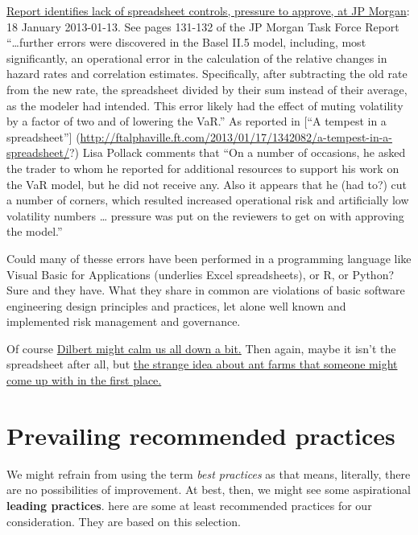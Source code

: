 \documentclass[
]{book}
\begin{document}
\begin{itemize}
  \href{http://files.shareholder.com/downloads/ONE/2261602328x0x628656/4cb574a0-0bf5-4728-9582-625e4519b5ab/Task_Force_Report.pdf}{Report identifies lack of spreadsheet controls, pressure to approve, at JP Morgan}: 18 January 2013-01-13. See pages 131-132 of the JP Morgan Task Force Report ``\ldots further errors were discovered in the Basel II.5 model, including, most significantly, an operational error in the calculation of the relative changes in hazard rates and correlation estimates. Specifically, after subtracting the old rate from the new rate, the spreadsheet divided by their sum instead of their average, as the modeler had intended. This error likely had the effect of muting volatility by a factor of two and of lowering the VaR.'' As reported in {[}``A tempest in a spreadsheet''{]} (\url{http://ftalphaville.ft.com/2013/01/17/1342082/a-tempest-in-a-spreadsheet/}?) Lisa Pollack comments that ``On a number of occasions, he asked the trader to whom he reported for additional resources to support his work on the VaR model, but he did not receive any. Also it appears that he (had to?) cut a number of corners, which resulted increased operational risk and artificially low volatility numbers \ldots{} pressure was put on the reviewers to get on with approving the model.''
\end{itemize}

Could many of thesse errors have been performed in a programming language like Visual Basic for Applications (underlies Excel spreadsheets), or R, or Python? Sure and they have. What they share in common are violations of basic software engineering design principles and practices, let alone well known and implemented risk management and governance.

Of course \href{https://dilbert.com/strip/2009-05-21}{Dilbert might calm us all down a bit.} Then again, maybe it isn't the spreadsheet after all, but \href{https://dilbert.com/strip/1995-08-13}{the strange idea about ant farms that someone might come up with in the first place.}

\hypertarget{prevailing-recommended-practices}{%
\section{Prevailing recommended practices}\label{prevailing-recommended-practices}}

We might refrain from using the term \emph{best practices} as that means, literally, there are no possibilities of improvement. At best, then, we might see some aspirational \textbf{leading practices}. here are some at least recommended practices for our consideration. They are based on this selection.
\end{document}
